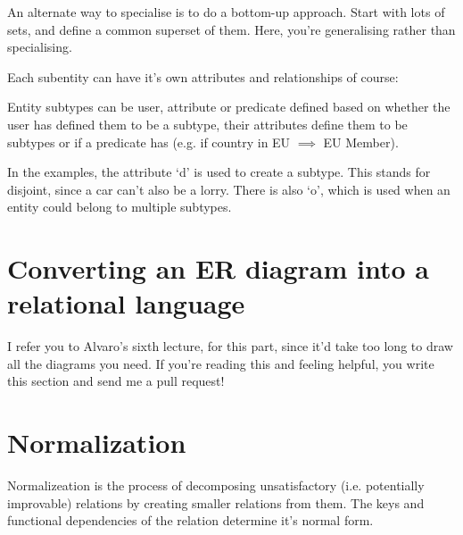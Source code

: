 An alternate way to specialise is to do a bottom-up approach. Start with lots of
sets, and define a common superset of them. Here, you're generalising rather
than specialising.

Each subentity can have it's own attributes and relationships of course:

\begin{center}
\end{center}

Entity subtypes can be user, attribute or predicate defined based on whether the
user has defined them to be a subtype, their attributes define them to be
subtypes or if a predicate has (e.g. if country in EU $\implies$ EU Member).

In the examples, the attribute `d' is used to create a subtype. This stands for
disjoint, since a car can't also be a lorry. There is also `o', which is used
when an entity could belong to multiple subtypes.

\section{Converting an ER diagram into a relational language}

I refer you to Alvaro's sixth lecture, for this part, since it'd take too long
to draw all the diagrams you need. If you're reading this and feeling helpful,
you write this section and send me a pull request!

\section{Normalization}

Normalizeation is the process of decomposing unsatisfactory (i.e. potentially
improvable) relations by creating smaller relations from them. The keys and
functional dependencies of the relation determine it's normal form.

